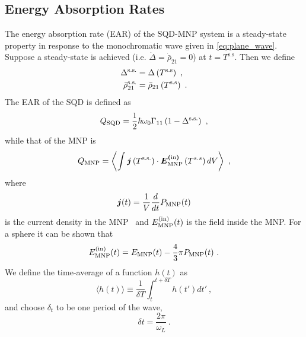 \subsection{Energy Absorption Rates}\label{sec:en_abs_rates}

The energy absorption rate (EAR) of the SQD-MNP system is a steady-state
property in response to the monochromatic wave given in \cref{eq:plane_wave}. Suppose a
steady-state is achieved (i.e. $\dot\Delta=\dot{\bar\rho}_{21}=0$) at
$t=T^\text{s.s}$. Then we define 
%
\begin{subequations}
\begin{align}
    \Delta^\text{s.s.} &= \Delta\left(T^\text{s.s}\right) \ ,\\
    \bar\rho_{21}^\text{s.s.} &= \bar\rho_{21}\left(T^\text{s.s}\right)  \ .
\end{align}
\label{eq:steady-state}
\end{subequations}
%
The EAR of the SQD is defined as 
%
\begin{equation}
    \qsqd = \frac{1}{2}\hbar\omega_0\Gamma_{11}\left( 1-\Deltass \right)\ ,
    \label{eq:qsqd}
\end{equation}
%
while that of the MNP is
%
\begin{equation}
    \qmnp = \left\langle \int \bm{j}\left(T^\text{s.s.}\right)\cdot
    \bm{\emnpin}\left(T^{s.s}\right)
    dV\right\rangle \ ,
    \label{eq:qmnp}
\end{equation}
%
where
%
\begin{equation}
    \bm j(t) = \frac{1}{V}\frac{d}{d t} \pmnp(t) 
    \label{eq:current_density}
\end{equation}
%
is the current density in the MNP~\cite{artuso_strongly_2010} and
$E_\text{MNP}^{(\text{in})}(t)$ is the field inside the MNP. For a sphere it can be shown
that~\cite{landau_electrodynamics_1984}
%
\begin{equation}
    \emnpin(t) = \emnp(t) - \frac{4}{3}\pi \pmnp(t) \ .
    \label{eq:emnpin}
\end{equation}
%
We define the time-average of a function $h(t)$ as
%
\begin{equation}
    \langle h(t)\rangle \equiv \frac{1}{\delta T}\int_{t}^{t+\delta T} h(t')dt'
    \ ,
    \label{eq:time-average}
\end{equation}
%
and choose $\delta_t$ to be one period of the wave,
%
\begin{equation}
    \delta t = \frac{2\pi}{\omega_L} \ .
    \label{eq:delta_t}
\end{equation}
%
\\

